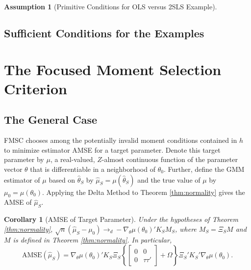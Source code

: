 \documentclass[12pt]{article}
\newtheorem{assump}{Assumption}[section]
\newtheorem{cor}{Corollary}[section]
\theoremstyle{definition}
\begin{document}
\begin{assump}[Primitive Conditions for OLS versus 2SLS Example]
	\label{assump:OLSvsIVlocal}

\end{assump}


\subsection{Sufficient Conditions for the Examples}
\label{sec:sufficient}


\section{The Focused Moment Selection Criterion}
\label{sec:FMSC}

\subsection{The General Case}
FMSC chooses among the potentially invalid moment conditions contained in $h$ to minimize estimator AMSE for a target parameter. Denote this target parameter by $\mu$, a real-valued, $Z$-almost continuous function of the parameter vector $\theta$ that is differentiable in a neighborhood of $\theta_0$. Further, define the GMM estimator of $\mu$ based on $\widehat{\theta}_S$ by $\widehat{\mu}_S = \mu(\widehat{\theta}_S)$ and the true value of $\mu$ by $\mu_0 = \mu(\theta_0)$. Applying the Delta Method to Theorem \ref{thm:normality} gives the AMSE of $\widehat{\mu}_S$.

\begin{cor}[AMSE of Target Parameter]
\label{cor:target}
Under the hypotheses of Theorem \ref{thm:normality}, $\sqrt{n}\left(\widehat{\mu}_S - \mu_0\right)\rightarrow_d-\nabla_\theta\mu(\theta_0)'K_S M_S$, where $M_S = \Xi_S M$ and $M$ is defined in Theorem \ref{thm:normality}. In particular,
	$$\mbox{AMSE}\left(\widehat{\mu}_S\right) = \nabla_\theta\mu(\theta_0)'K_S \Xi_S \left\{\left[\begin{array}{cc}0&0\\0&\tau\tau'\end{array}\right] + \Omega\right\}\Xi_S'K_S'\nabla_\theta\mu(\theta_0).$$
\end{cor}
\end{document}
